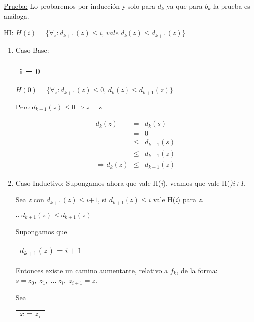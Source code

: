 \documentclass[12pt,a4paper]{report}
\begin{document}
		\underline{Prueba:} Lo probaremos por inducción y solo para $d_{k}$ ya que para $b_{k}$ la prueba es análoga.
		
		\begin{center}
			HI: $H(i) = \lbrace\forall_{z}: d_{k+1}(z) \leq \textit{i}, \, vale \; d_{k}(z) \leq d_{k+1}(z)  \rbrace$
		\end{center}
		
		\begin{enumerate}
			\item Caso Base: \begin{tabular}{|c|} \hline i = 0 \\ \hline \end{tabular} \qquad	$H(0) = \lbrace\forall_{z}: d_{k+1}(z) \leq 0, \, d_{k}(z) \leq d_{k+1}(z)  \rbrace$
			
			Pero $d_{k+1}(z) \leq 0 \Rightarrow z = \textit{s}$
			
			\begin{eqnarray}
				\nonumber d_{k}(z) & = & d_{k}(\textit{s}) \\
				\nonumber & = & 0 \\
				\nonumber & \leq & d_{k+1}(\textit{s}) \\
				\nonumber & \leq & d_{k+1}(z) \\
				\nonumber \Rightarrow d_{k}(z) & \leq & d_{k+1}(z)
			\end{eqnarray}
			
			\item Caso Inductivo: Supongamos ahora que vale H(\textit{i}), veamos que vale H(\textit{)i+1}.
			
			Sea \textit{z} con $d_{k+1}(z) \leq \textit{i+1}$, si $d_{k+1}(z) \leq \textit{i}$ vale H(\textit{i}) para \textit{z}. 
			
			\begin{center} $\therefore \; d_{k+1}(z) \leq d_{k+1}(z) $ \end{center}
			
			Supongamos que \begin{tabular}{|c|} \hline $d_{k+1}(z) = i+1$ \\ \hline \end{tabular}
			
			Entonces existe un camino aumentante, relativo a $f_{k}$, de la forma: $s = z_{0}, \; z_{1}, \; \dotsc \; z_{i}, \; z_{i+1} = z$.
			
			Sea \begin{tabular}{|c|} \hline $x = z_{i}$ \\ \hline \end{tabular}
			

\end{enumerate}
\end{document}

